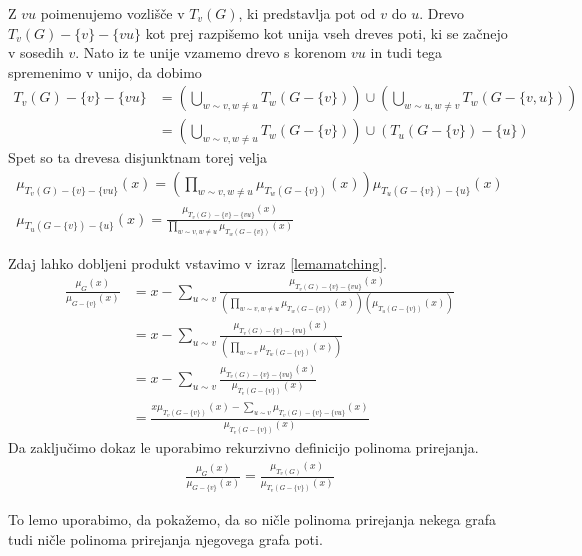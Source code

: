 \begin{dokaz}
    Z \(vu\) poimenujemo vozlišče v \(T_v(G)\), ki predstavlja pot od \(v\) do \(u\). Drevo \(T_v(G) - \{v\} - \{vu\}\) kot prej razpišemo kot unija vseh dreves poti, ki se začnejo v sosedih \(v\). Nato iz te unije vzamemo drevo s korenom \(vu\) in tudi tega spremenimo v unijo, da dobimo
    \begin{align*}
        T_v(G) - \{v\} - \{vu\} & = \left(\bigcup_{w\sim v, w\neq u} T_w(G-\{v\})\right) \cup \left(\bigcup_{w\sim u, w\neq v} T_w(G-\{v,u\})\right) \\
                                & = \left(\bigcup_{w\sim v, w\neq u} T_w(G-\{v\})\right) \cup (T_u(G-\{v\}) - \{u\})
    \end{align*}
    Spet so ta drevesa disjunktnam torej velja
    \begin{align*}
        \mu_{T_v(G) - \{v\} - \{vu\}}(x) = \left(\prod_{w\sim v, w\neq u} \mu_{T_w(G-\{v\})}(x)\right) \mu_{T_u(G-\{v\}) - \{u\}}(x) \\
        \mu_{T_u(G-\{v\}) - \{u\}}(x) = \frac{\mu_{T_v(G) - \{v\} - \{vu\}}(x)}{\prod_{w\sim v, w\neq u} \mu_{T_w(G-\{v\})}(x)}
    \end{align*}

    Zdaj lahko dobljeni produkt vstavimo v izraz \ref{lemamatching}.
    \begin{align*}
        \frac{\mu_G(x)}{\mu_{G-\{v\}}(x)} & =x - \sum_{u\sim v}\frac{\mu_{T_v(G) - \{v\} - \{vu\}}(x)}{(\prod_{w\sim v, w\neq u} \mu_{T_w(G-\{v\})}(x))(\mu_{T_u(G-\{v\})}(x))} \\
                                          & = x - \sum_{u\sim v}\frac{\mu_{T_v(G) - \{v\} - \{vu\}}(x)}{(\prod_{w\sim v} \mu_{T_w(G-\{v\})}(x))}                                \\
                                          & = x - \sum_{u\sim v}\frac{\mu_{T_v(G) - \{v\} - \{vu\}}(x)}{\mu_{T_v(G-\{v\})}(x)}                                                  \\
                                          & = \frac{x \mu_{T_v(G-\{v\})}(x) - \sum_{u\sim v} \mu_{T_v(G) - \{v\} - \{vu\}}(x)}{\mu_{T_v(G-\{v\})}(x)}
    \end{align*}
    Da zaključimo dokaz le uporabimo rekurzivno definicijo polinoma prirejanja.
    \begin{align*}
        \frac{\mu_G(x)}{\mu_{G-\{v\}}(x)} = \frac{\mu_{T_v(G)}(x)}{\mu_{T_v(G-\{v\})}(x)}
    \end{align*}
\end{dokaz}

To lemo uporabimo, da pokažemo, da so ničle polinoma prirejanja nekega grafa tudi ničle polinoma prirejanja njegovega grafa poti.

